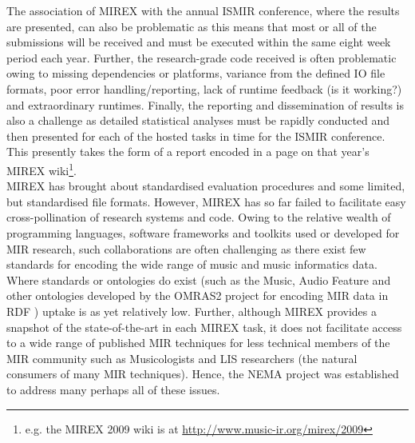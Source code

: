 \documentclass[conference]{IEEEtran}
\begin{document}
The association of MIREX with the annual ISMIR conference, where the results are presented, can also be problematic as this means that most or all of the submissions will be received and must be executed within the same eight week period each year. 
Further, the research-grade code received is often problematic owing to missing dependencies or platforms, variance from the defined IO file formats, poor error handling/reporting, lack of runtime feedback (is it working?) and extraordinary runtimes. 
Finally, the reporting and dissemination of results is also a challenge as detailed statistical analyses must be rapidly conducted and then presented for each of the hosted tasks in time for the ISMIR conference. This presently takes the form of a report encoded in a page on that year's MIREX wiki\footnote{e.g. the MIREX 2009 wiki is at \url{http://www.music-ir.org/mirex/2009}}.\\

MIREX has brought about standardised evaluation procedures and some limited, but standardised file formats.
However, MIREX has so far failed to facilitate easy cross-pollination of research systems and code. Owing to the relative wealth of programming languages, software frameworks and toolkits used or developed for MIR research, such collaborations are often challenging as there exist few standards for encoding the wide range of music and music informatics data. Where standards or ontologies do exist (such as the Music, Audio Feature and other ontologies developed by the OMRAS2 project for encoding MIR data in RDF \cite{raimond2007music}) uptake is as yet relatively low.  
Further, although MIREX provides a snapshot of the state-of-the-art in each MIREX task, it does not facilitate access to a wide range of published MIR techniques for less technical members of the MIR community such as Musicologists and LIS researchers (the natural consumers of many MIR techniques). Hence, the NEMA project was established to address many perhaps all of these issues.
\end{document}

